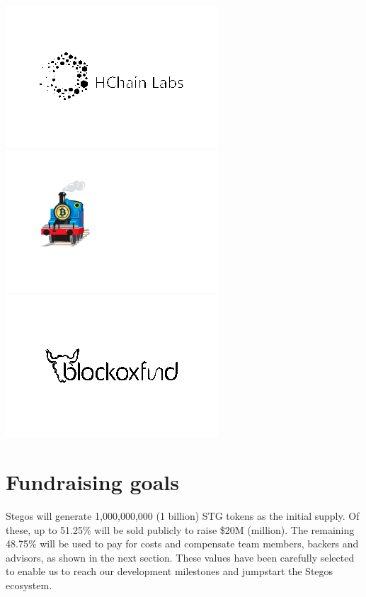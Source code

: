 \documentclass[8pt,fleqn,openany]{book}
\begin{document}
{{\begin{multicols}{7}[\columnsep=1cm]
				\columnbreak
				\includegraphics[scale=\imgscale]{images/partners/partners-5.png}
				\columnbreak
				\includegraphics[scale=\imgscale]{images/partners/partners-6.png}
				\columnbreak
				\includegraphics[scale=\imgscale]{images/partners/partners-7.png}
			\end{multicols}
		}
		
		\section{Fundraising goals}
		Stegos will generate 1,000,000,000 (1 billion) STG tokens as the initial supply. Of these, up to 51.25\% will be sold publicly to raise \$20M (million). The remaining 48.75\% will be used to pay for costs and compensate team members, backers and advisors, as shown in the next section. These values have been carefully selected to enable us to reach our development milestones and jumpstart the Stegos ecosystem.
		
}
\end{document}
